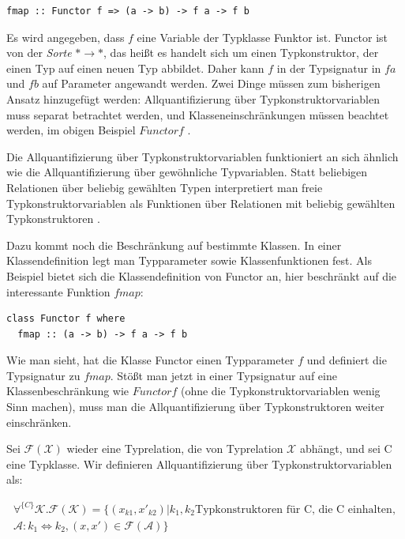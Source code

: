 \begin{verbatim}
fmap :: Functor f => (a -> b) -> f a -> f b
\end{verbatim}

Es wird angegeben, dass $f$ eine Variable der Typklasse Funktor ist. Functor ist von der \textit{Sorte} $* \rightarrow *$,
das heißt es handelt sich um einen Typkonstruktor, der einen Typ auf einen neuen Typ abbildet.
Daher kann $f$ in der Typsignatur in $f a$ und $f b$ auf Parameter angewandt werden.
Zwei Dinge müssen zum bisherigen Ansatz hinzugefügt werden: Allquantifizierung über Typkonstruktorvariablen muss separat betrachtet werden, und Klasseneinschränkungen müssen beachtet werden, im obigen Beispiel $Functor f$ \cite{voigtlander}.

Die Allquantifizierung über Typkonstruktorvariablen funktioniert an sich ähnlich wie die Allquantifizierung über gewöhnliche
Typvariablen. Statt beliebigen Relationen über beliebig gewählten Typen interpretiert man freie Typkonstruktorvariablen als
Funktionen über Relationen mit beliebig gewählten Typkonstruktoren \cite{voigtlander}.

Dazu kommt noch die Beschränkung auf bestimmte Klassen. In einer Klassendefinition legt man Typparameter sowie
Klassenfunktionen fest. Als Beispiel bietet sich die Klassendefinition von Functor an, hier beschränkt auf die interessante Funktion
$fmap$:

\begin{verbatim}
class Functor f where
  fmap :: (a -> b) -> f a -> f b
\end{verbatim}

Wie man sieht, hat die Klasse Functor einen Typparameter $f$ und definiert die Typsignatur zu $fmap$. Stößt man jetzt in
einer Typsignatur auf eine Klassenbeschränkung wie $Functor f$ (ohne die Typkonstruktorvariablen wenig Sinn machen),
muss man die Allquantifizierung über Typkonstruktoren weiter einschränken.

Sei $\mathcal{F}(\mathcal{X})$ wieder eine Typrelation, die von Typrelation $\mathcal{X}$ abhängt, und sei C eine Typklasse. Wir definieren Allquantifizierung über Typkonstruktorvariablen als:

\begin{align*}
\forall^{\{C\}} \mathcal{K} . \mathcal{F}(\mathcal{K}) = \{ 
(x_{k1}, x'_{k2}) | k_1, k_2 \text{Typkonstruktoren für C, die C einhalten},\\
\mathcal{A} : k_1 \Leftrightarrow k_2, (x, x') \in \mathcal{F}(\mathcal{A})
\}
\end{align*}

